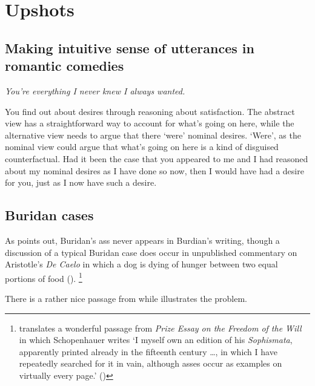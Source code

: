 \documentclass[10pt]{article}
\begin{document}
\newpage
\section{Upshots}
\label{sec:upshots}

\subsection{Making intuitive sense of utterances in romantic comedies}
\label{sec:making-intu-sense}

\begin{center}
  \emph{You're everything I never knew I always wanted.}
\end{center}


You find out about desires through reasoning about satisfaction.
The abstract view has a straightforward way to account for what's going on here, while the alternative view needs to argue that there `were' nominal desires.
`Were', as the nominal view could argue that what's going on here is a kind of disguised counterfactual.
Had it been the case that you appeared to me and I had reasoned about my nominal desires as I have done so now, then I would have had a desire for you, just as I now have such a desire.


\subsection{Buridan cases}
\label{sec:buridan-cases-1}

As \citeauthor{Rescher:1960aa} points out, Buridan's ass never appears in Burdian's writing, though a discussion of a typical Buridan case does occur in unpublished commentary on Aristotle's \emph{De Caelo} in which a dog is dying of hunger between two equal portions of food (\citeyear[154]{Rescher:1960aa}).\nolinebreak
\footnote{\citeauthor{Rescher:1960aa} translates a wonderful passage from \emph{Prize Essay on the Freedom of the Will} in which Schopenhauer writes `I myself own an edition of his \emph{Sophismata}, apparently printed already in the fifteenth century \dots, in which I have repeatedly searched for it in vain, although asses occur as examples on virtually every page.' (\citeyear[153]{Rescher:1960aa})}


There is a rather nice passage from \citeauthor{Reid:1815aa} while illustrates the problem.
\end{document}
